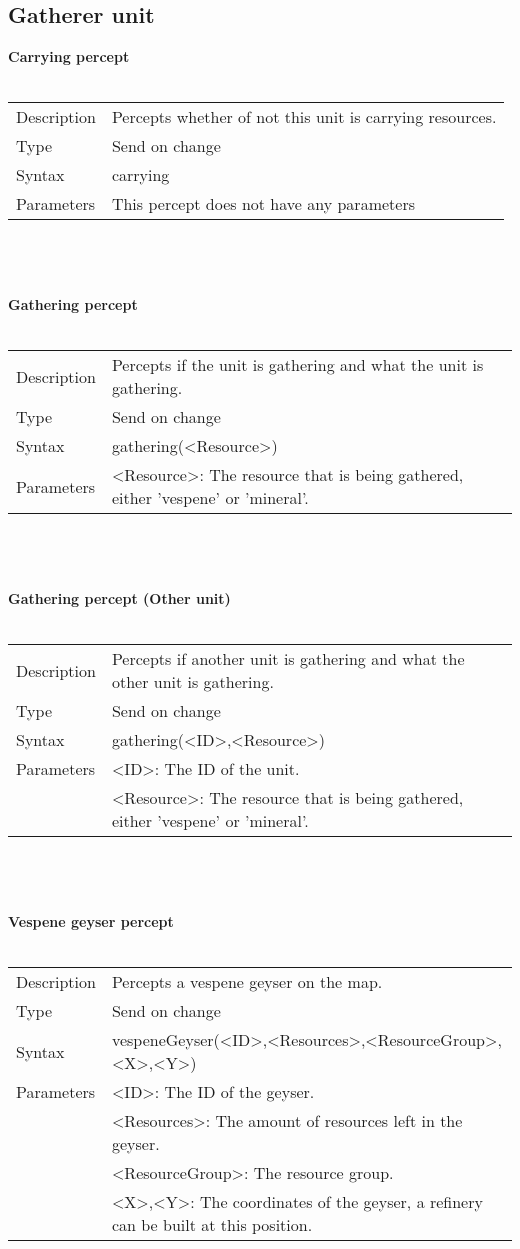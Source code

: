 \documentclass[english,11pt]{report}
\begin{document}
\subsection{Gatherer unit}
\textbf{Carrying percept}\\
\\
\begin{tabularx}{\textwidth}{lX}
 Description & Percepts whether of not this unit is carrying resources. \\
 Type & Send on change \\
 Syntax & carrying \\
 Parameters &   This percept does not have any parameters
\end{tabularx}\\
\\
\\
\textbf{Gathering percept}\\
\\
\begin{tabularx}{\textwidth}{lX}
 Description & Percepts if the unit is gathering and what the unit is gathering. \\
 Type & Send on change \\
 Syntax & gathering(<Resource>) \\
 Parameters &   <Resource>: The resource that is being gathered, either 'vespene' or 'mineral'.
\end{tabularx}\\
\\
\\
\textbf{Gathering percept (Other unit)}\\
\\
\begin{tabularx}{\textwidth}{lX}
 Description & Percepts if another unit is gathering and what the other unit is gathering. \\
 Type & Send on change \\
 Syntax & gathering(<ID>,<Resource>) \\
 Parameters &   <ID>: The ID of the unit.\\
            &   <Resource>: The resource that is being gathered, either 'vespene' or 'mineral'.
\end{tabularx}\\
\\
\\
\textbf{Vespene geyser percept}\\
\\
\begin{tabularx}{\textwidth}{lX}
 Description & Percepts a vespene geyser on the map. \\
 Type & Send on change \\
 Syntax & vespeneGeyser(<ID>,<Resources>,<ResourceGroup>,<X>,<Y>) \\
 Parameters &   <ID>: The ID of the geyser.\\
            &   <Resources>: The amount of resources left in the geyser.\\
            &   <ResourceGroup>: The resource group.\\
            &   <X>,<Y>: The coordinates of the geyser, a refinery can be built at this position.
\end{tabularx}
\end{document}
